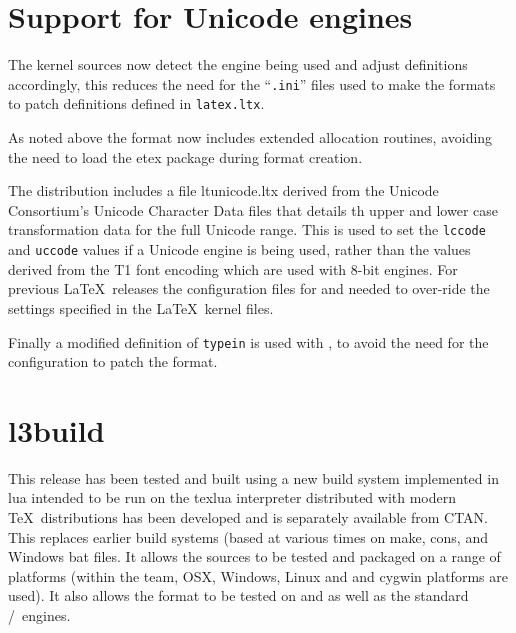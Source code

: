 \documentclass{ltnews}
\begin{document}
\section{Support for Unicode engines}

The kernel sources now detect the engine being used and adjust definitions
accordingly, this reduces the need for the ``\texttt{.ini}'' files used to make
the formats to patch definitions defined in \texttt{latex.ltx}.
 
As noted above the format now includes extended allocation routines, avoiding
the need to load the \textsf{etex} package during format creation.

The distribution includes a file \textsf{ltunicode.ltx} derived from the
Unicode Consortium's Unicode Character Data files that details th upper and
lower case transformation data for the full Unicode range. This is used to set
the \verb|lccode| and \verb|uccode| values if a Unicode engine is being used,
rather than the values derived from the T1 font encoding which are used with
8-bit engines. For previous \LaTeX\ releases the configuration files for
 and  needed to over-ride the settings specified
in the \LaTeX\ kernel files.

Finally a modified definition of \verb|typein| is used with , to
avoid the need for the  configuration to patch the format.

\section{l3build}

This release has been tested and built using a new build system implemented in
\textsf{lua} intended to be run on the \textsf{texlua} interpreter distributed
with modern \TeX\ distributions has been developed and is separately available
from CTAN. This replaces earlier build systems (based at various times on
\textsf{make}, \textsf{cons}, and Windows \textsf{bat} files. It allows the
sources to be tested and packaged on a range of platforms (within the team,
OSX, Windows, Linux and and cygwin platforms are used). It also allows the
format to be tested on  and  as well as the
standard /\eTeX\ engines.
\end{document}
